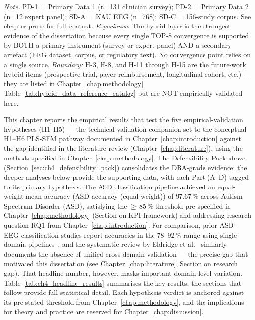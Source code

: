 \vspace{0.3em}\noindent\textit{Note.} PD-1 = Primary Data 1 (n=131 clinician survey); PD-2 = Primary Data 2 (n=12 expert panel); SD-A = KAU EEG (n=768); SD-C = 156-study corpus. See chapter prose for full context.
\vspace{0.5em}\noindent\textit{Experience.} The hybrid layer is the strongest evidence of the dissertation because every single TOP-8 convergence is supported by BOTH a primary instrument (survey or expert panel) AND a secondary artefact (EEG dataset, corpus, or regulatory text). No convergence point relies on a single source. \emph{Boundary:} H-3, H-8, and H-11 through H-15 are the future-work hybrid items (prospective trial, payer reimbursement, longitudinal cohort, etc.) — they are listed in Chapter~\ref{chap:methodology} Table~\ref{tab:hybrid_data_reference_catalog} but are NOT empirically validated here.

This chapter reports the empirical results that test the five empirical-validation hypotheses (H1--H5) — the technical-validation companion set to the conceptual H1--H6 PLS-SEM pathway documented in Chapter~\ref{chap:introduction} against the gap identified in the literature review (Chapter~\ref{chap:literature}), using the methods specified in Chapter~\ref{chap:methodology}. The Defensibility Pack above (Section~\ref{sec:ch4_defensibility_pack}) consolidates the DBA-grade evidence; the deeper analyses below provide the supporting data, with each Part (A--D) tagged to its primary hypothesis. The ASD classification pipeline achieved an equal-weight mean accuracy (ASD accuracy (equal-weight)) of 97.67\,\% across Autism Spectrum Disorder (ASD), satisfying the $\geq$\,85\,\% threshold pre-specified in Chapter~\ref{chap:methodology} (Section on KPI framework) and addressing research question RQ1 from Chapter~\ref{chap:introduction}. For comparison, prior ASD--EEG classification studies report accuracies in the 78--92\,\% range using single-domain pipelines~\cite{bosl2018eeg, ari2022asd, kang2020asd, duffy2019eeg}, and the systematic review by Eldridge et al.~\cite{eldridge2014asd} similarly documents the absence of unified cross-domain validation --- the precise gap that motivated this dissertation (see Chapter~\ref{chap:literature}, Section on research gap). That headline number, however, masks important domain-level variation. Table~\ref{tab:ch4_headline_results} summarises the key results; the sections that follow provide full statistical detail. Each hypothesis verdict is anchored against its pre-stated threshold from Chapter~\ref{chap:methodology}, and the implications for theory and practice are reserved for Chapter~\ref{chap:discussion}.

